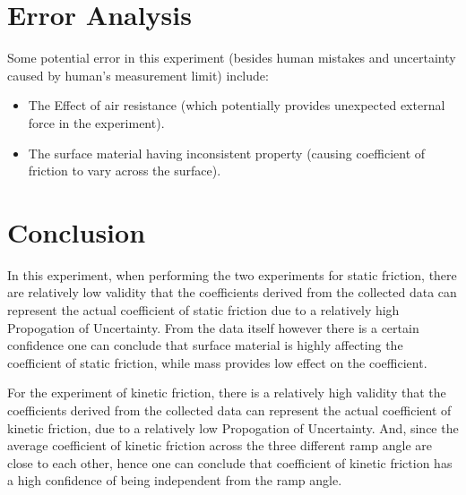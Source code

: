 \documentclass{article}
\begin{document}
\hfil

\section{Error Analysis}
Some potential error in this experiment (besides human mistakes and uncertainty caused by human's measurement limit) include:
\begin{itemize}
    \item The Effect of air resistance (which potentially provides unexpected external force in the experiment).
    \item The surface material having inconsistent property (causing coefficient of friction to vary across the surface).
\end{itemize}

\section{Conclusion}
In this experiment, when performing the two experiments for static friction, there are relatively low validity that the coefficients derived from the collected data can represent the actual coefficient of static friction due to a relatively high Propogation of Uncertainty. From the data itself however there is a certain confidence one can conclude that surface material is highly affecting the coefficient of static friction, while mass provides low effect on the coefficient.

For the experiment of kinetic friction, there is a relatively high validity that the coefficients derived from the collected data can represent the actual coefficient of kinetic friction, due to a relatively low Propogation of Uncertainty. And, since the average coefficient of kinetic friction across the three different ramp angle are close to each other, hence one can conclude that coefficient of kinetic friction has a high confidence of being independent from the ramp angle.

\newpage
\end{document}
